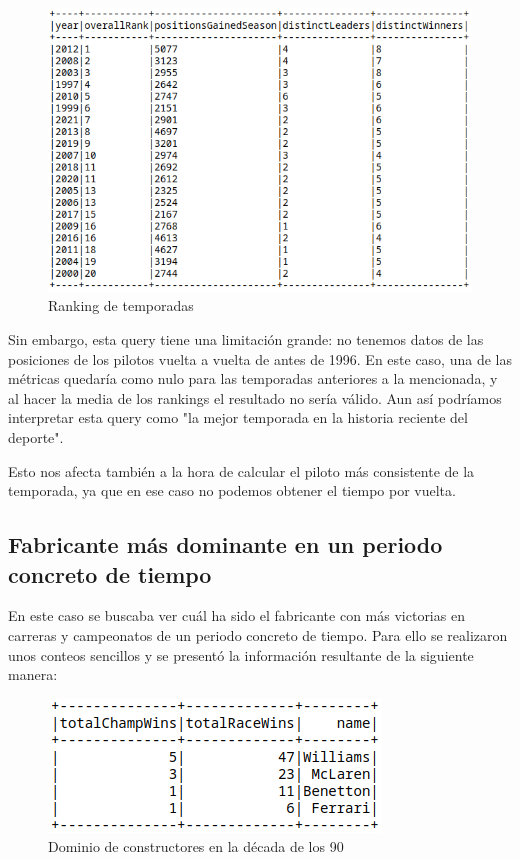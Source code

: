 \documentclass[12pt,twoside,titlepage]{report}
\begin{document}
\begin{figure}[H]
	\includegraphics[scale=0.4]{results/bestseason/bestseasonstats.png}
	\centering
	\caption{Ranking de temporadas}
	\label{fig:bestseason}
	\centering
\end{figure}

Sin embargo, esta query tiene una limitación grande: no tenemos datos de las posiciones de los pilotos vuelta a vuelta de antes de 1996. En este caso, una de las métricas quedaría como nulo para las temporadas anteriores a la mencionada, y al hacer la media de los rankings el resultado no sería válido. Aun así podríamos interpretar esta query como "la mejor temporada en la historia reciente del deporte".

Esto nos afecta también a la hora de calcular el piloto más consistente de la temporada, ya que en ese caso no podemos obtener el tiempo por vuelta.

\subsection{Fabricante más dominante en un periodo concreto de tiempo}

En este caso se buscaba ver cuál ha sido el fabricante con más victorias en carreras y campeonatos de un periodo concreto de tiempo. Para ello se realizaron unos conteos sencillos y se presentó la información resultante de la siguiente manera:

\begin{figure}[H]
	\includegraphics[scale=0.4]{results/constructordominance/90sconstructordominance.png}
	\centering
	\caption{Dominio de constructores en la década de los 90}
	\label{fig:constdominance}
	\centering
\end{figure}
\end{document}
